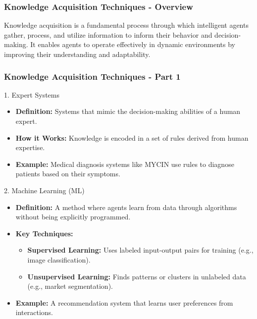 \documentclass[aspectratio=169]{beamer}
\begin{document}
\begin{frame}[fragile]
    \frametitle{Knowledge Acquisition Techniques - Overview}
    Knowledge acquisition is a fundamental process through which intelligent agents gather, process, and utilize information to inform their behavior and decision-making. It enables agents to operate effectively in dynamic environments by improving their understanding and adaptability.
\end{frame}

\begin{frame}[fragile]
    \frametitle{Knowledge Acquisition Techniques - Part 1}
    \begin{block}{1. Expert Systems}
        \begin{itemize}
            \item \textbf{Definition:} Systems that mimic the decision-making abilities of a human expert.
            \item \textbf{How it Works:} Knowledge is encoded in a set of rules derived from human expertise.
            \item \textbf{Example:} Medical diagnosis systems like MYCIN use rules to diagnose patients based on their symptoms.
        \end{itemize}
    \end{block}
    
    \begin{block}{2. Machine Learning (ML)}
        \begin{itemize}
            \item \textbf{Definition:} A method where agents learn from data through algorithms without being explicitly programmed.
            \item \textbf{Key Techniques:}
            \begin{itemize}
                \item \textbf{Supervised Learning:} Uses labeled input-output pairs for training (e.g., image classification).
                \item \textbf{Unsupervised Learning:} Finds patterns or clusters in unlabeled data (e.g., market segmentation).
            \end{itemize}
            \item \textbf{Example:} A recommendation system that learns user preferences from interactions.
        \end{itemize}
    \end{block}
\end{frame}
\end{document}
